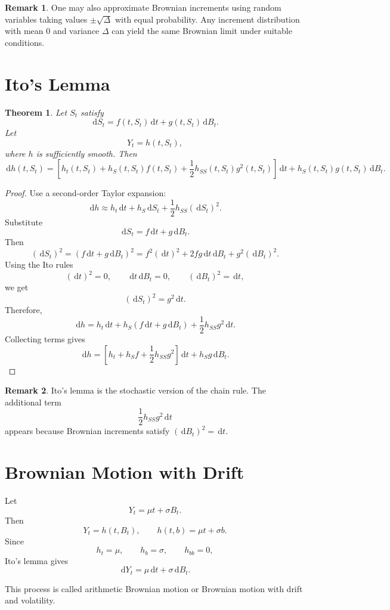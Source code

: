 \documentclass[12pt,oneside]{book}
\numberwithin{equation}{section}
\theoremstyle{definition}
\newtheorem{remark}{Remark}[section]
\theoremstyle{plain}
\newtheorem{theorem}{Theorem}[section]
\theoremstyle{remark}
\newcommand{\dd}{\,\mathrm{d}}
\begin{document}
\begin{remark}
One may also approximate Brownian increments using random variables taking values $\pm\sqrt{\Delta}$ with equal probability. Any increment distribution with mean $0$ and variance $\Delta$ can yield the same Brownian limit under suitable conditions.
\end{remark}

\section{Ito's Lemma}

\begin{theorem}
Let $S_t$ satisfy
\[
\dd S_t=f(t,S_t)\dd t+g(t,S_t)\dd B_t.
\]
Let
\[
Y_t=h(t,S_t),
\]
where $h$ is sufficiently smooth. Then
\[
\dd h(t,S_t)
=
\left[
h_t(t,S_t)
+
h_S(t,S_t)f(t,S_t)
+
\frac{1}{2}h_{SS}(t,S_t)g^2(t,S_t)
\right]\dd t
+
h_S(t,S_t)g(t,S_t)\dd B_t.
\]
\end{theorem}

\begin{proof}
Use a second-order Taylor expansion:
\[
\dd h
\approx
h_t\dd t+h_S\dd S_t+\frac{1}{2}h_{SS}(\dd S_t)^2.
\]
Substitute
\[
\dd S_t=f\dd t+g\dd B_t.
\]
Then
\[
(\dd S_t)^2
=
(f\dd t+g\dd B_t)^2
=
f^2(\dd t)^2+2fg\dd t\dd B_t+g^2(\dd B_t)^2.
\]
Using the Ito rules
\[
(\dd t)^2=0,
\qquad
\dd t\dd B_t=0,
\qquad
(\dd B_t)^2=\dd t,
\]
we get
\[
(\dd S_t)^2=g^2\dd t.
\]
Therefore,
\[
\dd h
=
h_t\dd t+h_S(f\dd t+g\dd B_t)+\frac{1}{2}h_{SS}g^2\dd t.
\]
Collecting terms gives
\[
\dd h
=
\left[
h_t+h_Sf+\frac{1}{2}h_{SS}g^2
\right]\dd t
+
h_Sg\dd B_t.
\]
\end{proof}

\begin{remark}
Ito's lemma is the stochastic version of the chain rule. The additional term
\[
\frac{1}{2}h_{SS}g^2\dd t
\]
appears because Brownian increments satisfy $(\dd B_t)^2=\dd t$.
\end{remark}

\section{Brownian Motion with Drift}

Let
\[
Y_t=\mu t+\sigma B_t.
\]
Then
\[
Y_t=h(t,B_t),
\qquad
h(t,b)=\mu t+\sigma b.
\]
Since
\[
h_t=\mu,
\qquad
h_b=\sigma,
\qquad
h_{bb}=0,
\]
Ito's lemma gives
\[
\dd Y_t=\mu\dd t+\sigma\dd B_t.
\]

This process is called arithmetic Brownian motion or Brownian motion with drift and volatility.
\end{document}
